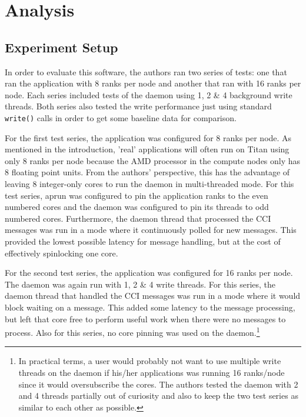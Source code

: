\section{Analysis}
\label{sec:analysis}

\subsection{Experiment Setup}
\label{subsec:exp_setup}

In order to evaluate this software, the authors ran two series of tests: one that ran the application with 8 ranks per node and another that ran with 16 ranks per node.  Each series included tests of the daemon using 1, 2 \& 4 background write threads.  Both series also tested the write performance just using standard \texttt{write()} calls in order to get some baseline data for comparison.

For the first test series, the application was configured for 8 ranks per node.  As mentioned in the introduction, 'real' applications will often run on Titan using only 8 ranks per node because the AMD processor in the compute nodes only has 8 floating point units.  From the authors' perspective, this has the advantage of leaving 8 integer-only cores to run the daemon in multi-threaded mode.  For this test series, aprun was configured to pin the application ranks to the even numbered cores and the daemon was configured to pin its threads to odd numbered cores.  Furthermore, the daemon thread that processed the CCI messages was run in a mode where it continuously polled for new messages.  This  provided the lowest possible latency for message handling, but at the cost of effectively spinlocking one core. 

For the second test series, the application was configured for 16 ranks per node.  The daemon was again run with 1, 2 \& 4 write threads.  For this series, the daemon thread that handled the CCI messages was run in a mode where it would block waiting on a message.  This added some latency to the message processing, but left that core free to perform useful work when there were no messages to process.  Also for this series, no core pinning was used on the daemon.\footnote{In practical terms, a user would probably not want to use multiple write threads on the daemon if his/her applications was running 16 ranks/node since it would oversubscribe the cores.  The authors tested the daemon with 2 and 4 threads partially out of curiosity and also to keep the two test series as similar to each other as possible.}   

